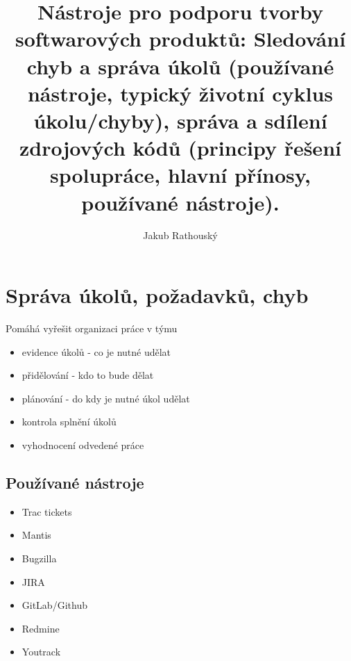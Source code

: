 \documentclass{szzclass}
\title{Nástroje pro podporu tvorby softwarových produktů: Sledování chyb a správa úkolů (používané nástroje, typický životní cyklus úkolu/chyby),
 správa a sdílení zdrojových kódů (principy řešení spolupráce, hlavní přínosy, používané nástroje).}
\author{Jakub Rathouský}
\begin{document}
\maketitle
\newpage
\tableofcontents
\newpage

\section{Správa úkolů, požadavků, chyb}
Pomáhá vyřešit organizaci práce v týmu
\begin{itemize}
    \item evidence úkolů - co je nutné udělat
    \item přidělování - kdo to bude dělat
    \item plánování - do kdy je nutné úkol udělat
    \item kontrola splnění úkolů
    \item vyhodnocení odvedené práce
\end{itemize}
\subsection{Používané nástroje}
\begin{itemize}
    \item Trac tickets
    \item Mantis
    \item Bugzilla
    \item JIRA
    \item GitLab/Github
    \item Redmine
    \item Youtrack
\end{itemize}
\end{document}
